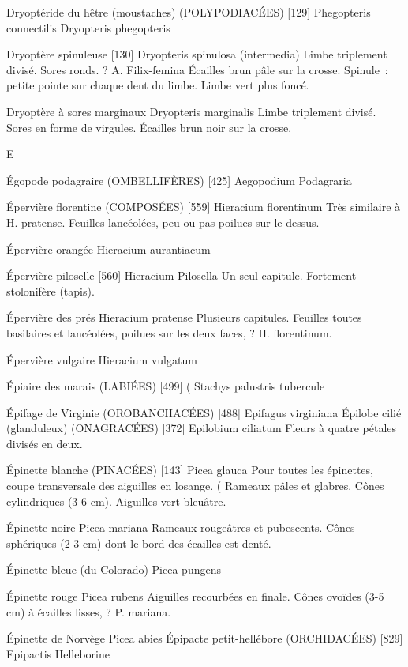 \documentclass[book,12pt,a4paper,onecolumn,openany]{memoir}
\begin{document}
Dryoptéride du hêtre (moustaches) (POLYPODIACÉES)  [129]
				Phegopteris connectilis
				Dryopteris phegopteris

Dryoptère spinuleuse  [130]
				Dryopteris spinulosa (intermedia)
Limbe triplement divisé. Sores ronds.
? A. Filix-femina
Écailles brun pâle sur la crosse.
Spinule : petite pointe sur chaque dent du limbe.
Limbe vert plus foncé.

Dryoptère à sores marginaux
				Dryopteris marginalis
Limbe triplement divisé. Sores en forme de virgules.
Écailles brun noir sur la crosse.

E

Égopode podagraire (OMBELLIFÈRES)  [425]
				Aegopodium Podagraria



Épervière florentine (COMPOSÉES)  [559]
				Hieracium florentinum
Très similaire à H. pratense. Feuilles lancéolées, peu ou pas poilues sur le dessus.

Épervière orangée
				Hieracium aurantiacum

Épervière piloselle  [560]
				Hieracium Pilosella
Un seul capitule. Fortement stolonifère (tapis).

Épervière des prés
				Hieracium pratense
Plusieurs capitules. Feuilles toutes basilaires et lancéolées, poilues sur les deux faces, ? H. florentinum.

Épervière vulgaire
				Hieracium vulgatum

Épiaire des marais (LABIÉES)  [499]				(
				Stachys palustris			tubercule

Épifage de Virginie (OROBANCHACÉES)  [488]
				Epifagus virginiana
Épilobe cilié (glanduleux) (ONAGRACÉES)  [372]
				Epilobium ciliatum
Fleurs à quatre pétales divisés en deux.

Épinette blanche (PINACÉES)  [143]
				Picea glauca
Pour toutes les épinettes, coupe transversale des aiguilles en losange. (
Rameaux pâles et glabres. Cônes cylindriques (3-6 cm).
Aiguilles vert bleuâtre.

Épinette noire
				Picea mariana
Rameaux rougeâtres et pubescents.
Cônes sphériques (2-3 cm) dont le bord des écailles est denté.

Épinette bleue (du Colorado)
				Picea pungens

Épinette rouge
				Picea rubens
Aiguilles recourbées en finale.
Cônes ovoïdes (3-5 cm) à écailles lisses, ? P. mariana.

Épinette de Norvège
				Picea abies
Épipacte petit-hellébore (ORCHIDACÉES)  [829]
				Epipactis Helleborine
\end{document}
